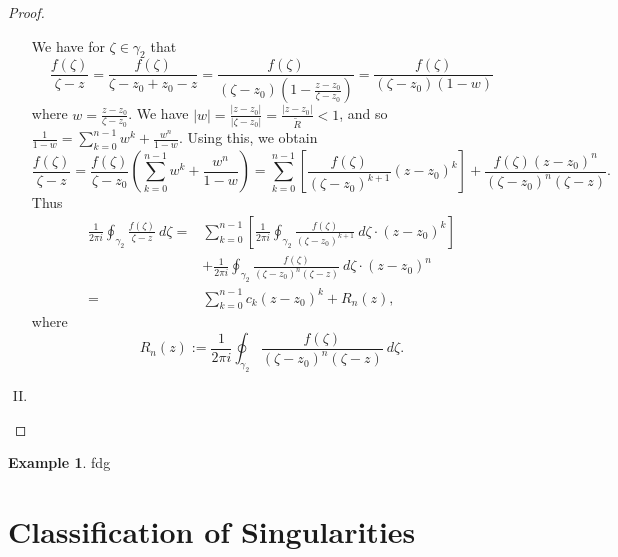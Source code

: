 \documentclass[12pt,openany]{book}
\theoremstyle{definition}
\newtheorem{example}{Example}[section]
\newcommand{\of}[1]{\left( #1 \right)}
\newcommand{\abs}[1]{\left\lvert #1 \right\rvert}
\begin{document}
\begin{proof}
\begin{enumerate}[(I)]
			We have for $\zeta\in\gamma_2$ that \[
			\frac{f(\zeta)}{\zeta-z}=\frac{f(\zeta)}{\zeta-z_0+z_0-z}=\frac{f(\zeta)}{(\zeta-z_0)\of{1-\frac{z-z_0}{\zeta-z_0}}}=\frac{f(\zeta)}{(\zeta-z_0)(1-w)}
			\] where $w=\frac{z-z_0}{\zeta-z_0}$. We have $\displaystyle\abs{w}=\frac{\abs{z-z_0}}{\abs{\zeta-z_0}}=\frac{\abs{z-z_0}}{\tilde{R}}<1$, and so $\displaystyle
			\frac{1}{1-w}=\sum_{k=0}^{n-1}w^{k}+\frac{w^n}{1-w}.
			$ Using this, we obtain \[
			\frac{f(\zeta)}{\zeta-z}=\frac{f(\zeta)}{\zeta-z_0}\of{\sum_{k=0}^{n-1}w^{k}+\frac{w^n}{1-w}}=\sum_{k=0}^{n-1}\left[\frac{f(\zeta)}{(\zeta-z_0)^{k+1}}(z-z_0)^k\right]+\frac{f(\zeta)(z-z_0)^n}{(\zeta-z_0)^n(\zeta-z)}.
			\] Thus \begin{align*}
				\frac{1}{2\pi i}\oint_{\gamma_2}\frac{f(\zeta)}{\zeta-z}\ d\zeta=&\sum_{k=0}^{n-1}\left[\frac{1}{2\pi i}\oint_{\gamma_2}\frac{f(\zeta)}{(\zeta-z_0)^{k+1}}\ d\zeta\cdot(z-z_0)^k\right]\\
				&+\frac{1}{2\pi i}\oint_{\gamma_2}\frac{f(\zeta)}{(\zeta-z_0)^n(\zeta-z)}\ d\zeta\cdot(z-z_0)^n\\
				=&\sum_{k=0}^{n-1}c_k(z-z_0)^k+R_n(z),
			\end{align*} where \[
			R_n(z):=\frac{1}{2\pi i}\oint_{\gamma_2}\frac{f(\zeta)}{(\zeta-z_0)^n(\zeta-z)}\ d\zeta.
			\]
			\item 
		\end{enumerate}
		
	\end{proof}
	\vspace{4pt}
	\begin{example}
		fdg
	\end{example}
	
	\newpage
	\section{Classification of Singularities}
	
\end{document}
